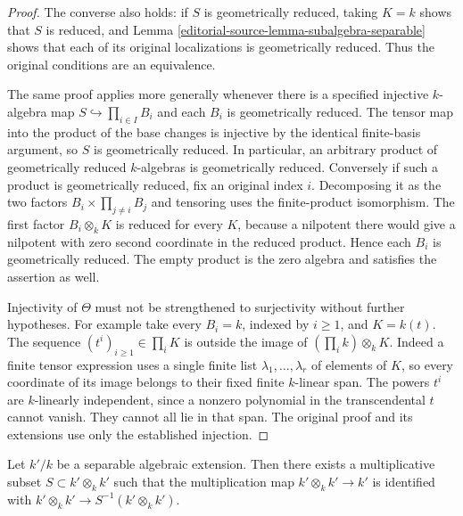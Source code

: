 \begin{proof}
The converse also holds: if $S$ is geometrically
reduced, taking $K=k$ shows that $S$ is reduced,
and Lemma \ref{editorial-source-lemma-subalgebra-separable} shows
that each of its original localizations is
geometrically reduced. Thus the original
conditions are an equivalence.

The same proof applies more generally whenever
there is a specified injective $k$-algebra map
$S\hookrightarrow\prod_{i\in I}B_i$ and each
$B_i$ is geometrically reduced. The tensor
map into the product of the base changes
is injective by the identical finite-basis
argument, so $S$ is geometrically reduced.
In particular, an arbitrary product of
geometrically reduced $k$-algebras is
geometrically reduced. Conversely if such
a product is geometrically reduced, fix
an original index $i$. Decomposing it as
the two factors $B_i\times\prod_{j\ne i}B_j$
and tensoring uses the finite-product
isomorphism. The first factor $B_i\otimes_kK$
is reduced for every $K$, because a nilpotent
there would give a nilpotent with zero
second coordinate in the reduced product.
Hence each $B_i$ is geometrically reduced.
The empty product is the zero algebra and
satisfies the assertion as well.

Injectivity of $\Theta$ must not be strengthened
to surjectivity without further hypotheses.
For example take every $B_i=k$, indexed by
$i\geq1$, and $K=k(t)$. The sequence
$(t^i)_{i\geq1}\in\prod_iK$ is outside the
image of $(\prod_i k)\otimes_kK$.
Indeed a finite tensor expression uses a
single finite list $\lambda_1,\ldots,\lambda_r$
of elements of $K$, so every coordinate
of its image belongs to their fixed finite
$k$-linear span. The powers $t^i$ are
$k$-linearly independent, since a nonzero
polynomial in the transcendental $t$ cannot
vanish. They cannot all lie in that span.
The original proof and its extensions use
only the established injection.
\end{proof}

\begin{lemma}
\label{editorial-source-lemma-separable-algebraic-diagonal}
Let $k'/k$ be a separable algebraic extension.
Then there exists a multiplicative subset $S \subset k' \otimes_k k'$
such that the multiplication map $k' \otimes_k k' \to k'$
is identified with $k' \otimes_k k' \to S^{-1}(k' \otimes_k k')$.
\end{lemma}

